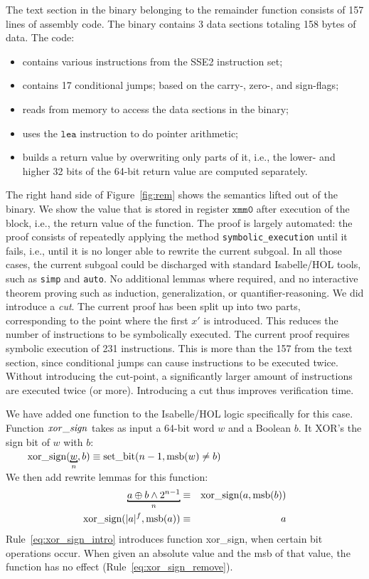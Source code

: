 The text section in the binary belonging to the remainder function consists of 157 lines of assembly code.
The binary contains 3 data sections totaling 158 bytes of data.
The code:
\begin{itemize}
\item contains various instructions from the SSE2 instruction set;
\item contains 17 conditional jumps; based on the carry-, zero-, and sign-flags;
\item reads from memory to access the data sections in the binary;
\item uses the $\texttt{lea}$ instruction to do pointer arithmetic;
\item builds a return value by overwriting only parts of it, i.e., the lower- and higher 32 bits of the 64-bit return value are computed separately.
\end{itemize}

The right hand side of Figure~\ref{fig:rem} shows the semantics lifted out of the binary.
We show the value that is stored in register $\mathtt{xmm0}$ after execution of the block, i.e., the return value of the function.
The proof is largely automated: the proof consists of repeatedly applying the method \texttt{symbolic\_execution} until it fails, i.e., until it is no longer able to rewrite the current subgoal.
In all those cases, the current subgoal could be discharged with standard Isabelle/HOL tools, such as \texttt{simp} and \texttt{auto}.
No additional lemmas where required, and no interactive theorem proving such as induction, generalization, or quantifier-reasoning.
We did introduce a \emph{cut}.
The current proof has been split up into two parts, corresponding to the point where the first $x'$ is introduced.
This reduces the number of instructions to be symbolically executed.
The current proof requires symbolic execution of 231 instructions.
This is more than the 157 from the text section, since conditional jumps can cause instructions to be executed twice.
Without introducing the cut-point, a significantly larger amount of instructions are executed twice (or more).
Introducing a cut thus improves verification time.

We have added one function to the Isabelle/HOL logic specifically for this case.
Function $\mathit{xor\_sign}$ takes as input a 64-bit word $w$ and a Boolean $b$.
It XOR's the sign bit of $w$ with $b$:
\\[1em]$
	\mbox{\hspace{5ex}} \mbox{xor\_sign}(\bitmoded{n}{w},b) \equiv \mbox{set\_bit}(n-1, \msb(w) \neq b)
$\\[1em]
We then add rewrite lemmas for this function:
\begin{eqnarray}
\bitmoded{n}{a \oplus b \wedge 2^{n-1}} &\equiv& \mbox{xor\_sign}(a, \msb(b)) \label{eq:xor_sign_intro}\\
\mbox{xor\_sign}(|a|^f, \msb(a)) & \equiv & a\label{eq:xor_sign_remove}
\end{eqnarray}
Rule~\ref{eq:xor_sign_intro} introduces function xor\_sign, when certain bit operations occur.
When given an absolute value and the msb of that value, the function has no effect (Rule~\ref{eq:xor_sign_remove}).



